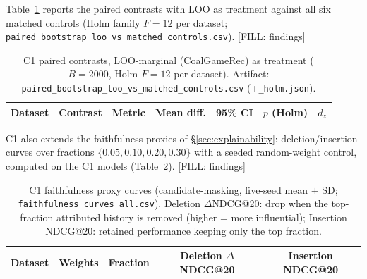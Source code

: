 Table~\ref{tab:c1_paired} reports the paired contrasts with LOO as treatment against all six matched controls (Holm family $F=12$ per dataset; \texttt{paired\_bootstrap\_loo\_vs\_matched\_controls.csv}). [FILL: findings]

\begin{table}[t]
\caption{C1 paired contrasts, LOO-marginal (CoalGameRec) as treatment ($B=2000$, Holm $F=12$ per dataset). Artifact: \texttt{paired\_bootstrap\_loo\_vs\_matched\_controls.csv} (+\texttt{\_holm.json}).}\label{tab:c1_paired}
\centering
\scriptsize
\begin{tabular}{lllllll}
\toprule
Dataset & Contrast & Metric & Mean diff. & 95\% CI & $p$ (Holm) & $d_z$ \\
\midrule
\bottomrule
\end{tabular}
\end{table}

C1 also extends the faithfulness proxies of \S\ref{sec:explainability}: deletion/insertion curves over fractions $\{0.05,0.10,0.20,0.30\}$ with a seeded random-weight control, computed on the C1 models (Table~\ref{tab:c1_faith}). [FILL: findings]

\begin{table}[t]
\caption{C1 faithfulness proxy curves (candidate-masking, five-seed mean $\pm$ SD; \texttt{faithfulness\_curves\_all.csv}). Deletion $\Delta$NDCG@20: drop when the top-fraction attributed history is removed (higher = more influential); Insertion NDCG@20: retained performance keeping only the top fraction.}\label{tab:c1_faith}
\centering
\scriptsize
\begin{tabular}{llccc}
\toprule
Dataset & Weights & Fraction & Deletion $\Delta$NDCG@20 & Insertion NDCG@20 \\
\midrule
\bottomrule
\end{tabular}
\end{table}
